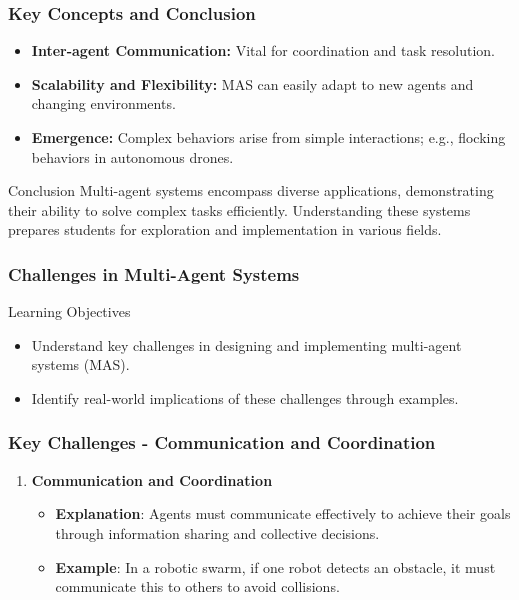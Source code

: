 \documentclass[aspectratio=169]{beamer}
\begin{document}
\begin{frame}[fragile]
    \frametitle{Key Concepts and Conclusion}
    \begin{itemize}
        \item \textbf{Inter-agent Communication:} Vital for coordination and task resolution.
        \item \textbf{Scalability and Flexibility:} MAS can easily adapt to new agents and changing environments.
        \item \textbf{Emergence:} Complex behaviors arise from simple interactions; e.g., flocking behaviors in autonomous drones.
    \end{itemize}
    
    \begin{block}{Conclusion}
        Multi-agent systems encompass diverse applications, demonstrating their ability to solve complex tasks efficiently. Understanding these systems prepares students for exploration and implementation in various fields.
    \end{block}
\end{frame}

\begin{frame}[fragile]
    \frametitle{Challenges in Multi-Agent Systems}
    \begin{block}{Learning Objectives}
        \begin{itemize}
            \item Understand key challenges in designing and implementing multi-agent systems (MAS).
            \item Identify real-world implications of these challenges through examples.
        \end{itemize}
    \end{block}
\end{frame}

\begin{frame}[fragile]
    \frametitle{Key Challenges - Communication and Coordination}
    \begin{enumerate}
        \item \textbf{Communication and Coordination}
            \begin{itemize}
                \item \textbf{Explanation}: Agents must communicate effectively to achieve their goals through information sharing and collective decisions.
                \item \textbf{Example}: In a robotic swarm, if one robot detects an obstacle, it must communicate this to others to avoid collisions.
            \end{itemize}
    \end{enumerate}
\end{frame}
\end{document}
